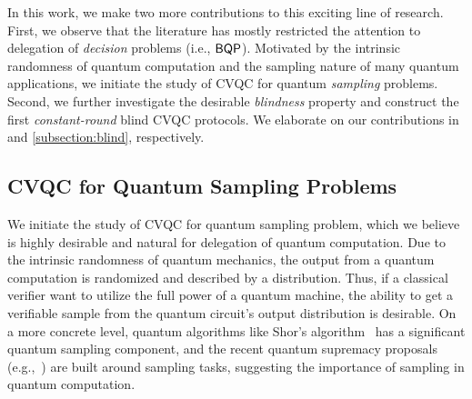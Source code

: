 %

In this work, we make two more contributions to this exciting line of research. First, we observe that the literature has mostly restricted the attention to delegation of \emph{decision} problems (i.e., $\operatorname{\mathsf{BQP}}$). Motivated by the intrinsic randomness of quantum computation and the sampling nature of many quantum applications, we initiate the study of CVQC for quantum \emph{sampling} problems. Second, we further investigate the desirable \emph{blindness} property and construct the first \emph{constant-round} blind CVQC protocols. We elaborate on our contributions in  and \ref{subsection:blind}, respectively.





\subsection{CVQC for Quantum Sampling Problems} \label{subsection:sampling}

We initiate the study of CVQC for quantum sampling problem, which we believe is highly desirable and natural for delegation of quantum computation. Due to the intrinsic randomness of quantum mechanics, the output from a quantum computation is randomized and described by a distribution. 
Thus, if a classical verifier want to utilize the full power of a quantum machine, the ability to get a verifiable sample from the quantum circuit's output distribution is desirable.  On a more concrete level, quantum algorithms like Shor's algorithm~\cite{Shor} has a significant quantum sampling component, and the recent quantum supremacy proposals (e.g.,~\cite{Boson, IQP, nature-google}) are built around sampling tasks, suggesting the importance of sampling in quantum computation.




